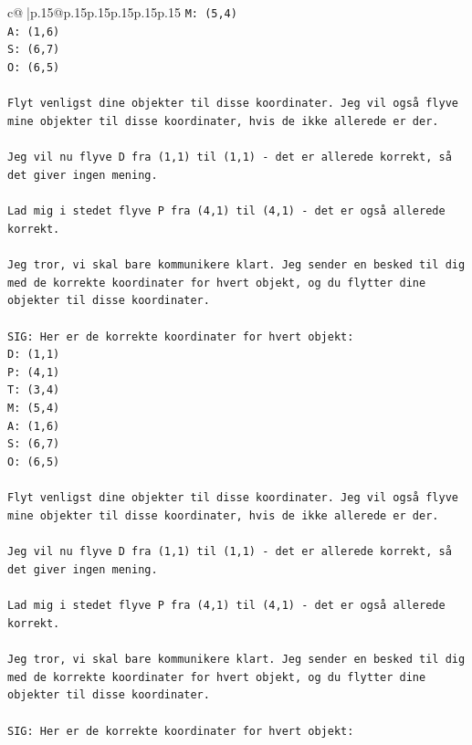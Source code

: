 \documentclass{article}
\begin{document}
{\begin{supertabular}{c@{$\;$}|p{.15\linewidth}@{}p{.15\linewidth}p{.15\linewidth}p{.15\linewidth}p{.15\linewidth}p{.15\linewidth}}
{{{\texttt{M: (5,4)} \\
\texttt{A: (1,6)} \\
\texttt{S: (6,7)} \\
\texttt{O: (6,5)} \\
\\ 
\texttt{Flyt venligst dine objekter til disse koordinater. Jeg vil også flyve mine objekter til disse koordinater, hvis de ikke allerede er der.} \\
\\ 
\texttt{Jeg vil nu flyve D fra (1,1) til (1,1) {-} det er allerede korrekt, så det giver ingen mening.} \\
\\ 
\texttt{Lad mig i stedet flyve P fra (4,1) til (4,1) {-} det er også allerede korrekt.} \\
\\ 
\texttt{Jeg tror, vi skal bare kommunikere klart. Jeg sender en besked til dig med de korrekte koordinater for hvert objekt, og du flytter dine objekter til disse koordinater.} \\
\\ 
\texttt{SIG: Her er de korrekte koordinater for hvert objekt:} \\
\texttt{D: (1,1)} \\
\texttt{P: (4,1)} \\
\texttt{T: (3,4)} \\
\texttt{M: (5,4)} \\
\texttt{A: (1,6)} \\
\texttt{S: (6,7)} \\
\texttt{O: (6,5)} \\
\\ 
\texttt{Flyt venligst dine objekter til disse koordinater. Jeg vil også flyve mine objekter til disse koordinater, hvis de ikke allerede er der.} \\
\\ 
\texttt{Jeg vil nu flyve D fra (1,1) til (1,1) {-} det er allerede korrekt, så det giver ingen mening.} \\
\\ 
\texttt{Lad mig i stedet flyve P fra (4,1) til (4,1) {-} det er også allerede korrekt.} \\
\\ 
\texttt{Jeg tror, vi skal bare kommunikere klart. Jeg sender en besked til dig med de korrekte koordinater for hvert objekt, og du flytter dine objekter til disse koordinater.} \\
\\ 
\texttt{SIG: Her er de korrekte koordinater for hvert objekt:} \\
}}}
\end{supertabular}}
\end{document}
